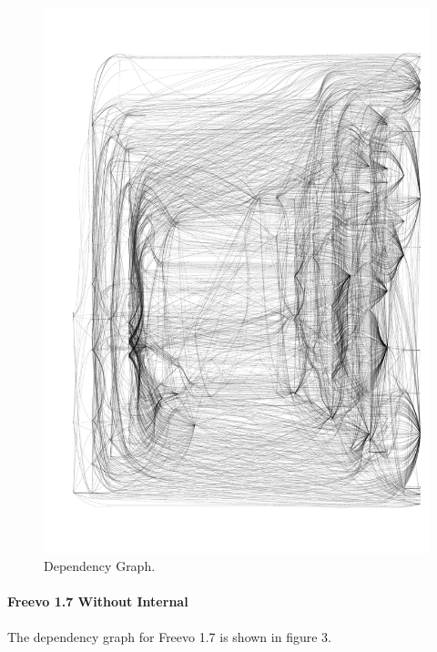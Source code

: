 \documentclass[10.5pt,journal, a4paper]{IEEEtran}
\begin{document}
\begin{figure}[]
 \centering 
 \includegraphics[width=\columnwidth]{19Full}
 \centering 
  \caption {Dependency Graph. }
 \end{figure}
 
 
 
 
 
 
\paragraph{Freevo 1.7 Without Internal}
\noindent

The dependency graph for Freevo 1.7 is shown in figure 3.
\end{document}
